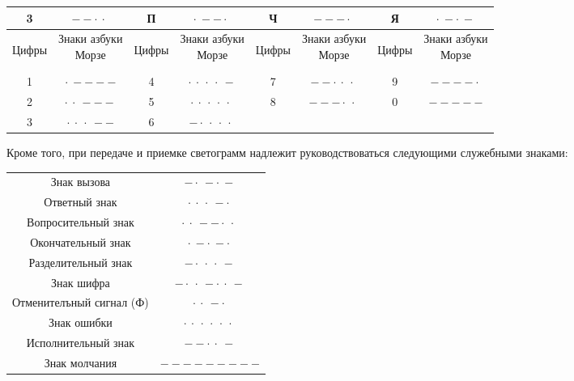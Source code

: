 \documentclass[a4paper, 12pt, twoside, final]{scrbook}
\begin{document}
\begin{longtable}{cccccccc}
	3 & \Large $- - \cdot\  \cdot\ $ & П & \Large $\cdot\  - - \cdot\ $ & Ч & \Large $- - - \cdot\ $ & Я & \Large $\cdot\  - \cdot\  -$ \\
	\midrule
	\midrule
	\begin{sideways}Цифры\end{sideways} & \shortstack[c]{Знаки азбуки\\Морзе} & \begin{sideways}Цифры\end{sideways} & \shortstack[c]{Знаки азбуки\\Морзе} & \begin{sideways}Цифры\end{sideways} & \shortstack[c]{Знаки азбуки\\Морзе} & \begin{sideways}Цифры\end{sideways} & \shortstack[c]{Знаки азбуки\\Морзе} \\
	\midrule
	1 & \Large $\cdot\  - - - -$ & 4 & \Large $\cdot\  \cdot\  \cdot\  \cdot\  -$ & 7 & \Large $- - \cdot\  \cdot\  \cdot\ $ & 9 & \Large $- - - - \cdot\ $ \\
	\midrule
	2 & \Large $\cdot\  \cdot\  - - -$ & 5 & \Large $\cdot\  \cdot\  \cdot\  \cdot\  \cdot\ $ & 8 & \Large $- - - \cdot\  \cdot\ $ & 0 & \Large $- - - - -$ \\
	\midrule
	3 & \Large $\cdot\  \cdot\  \cdot\  - -$ & 6 & \Large $- \cdot\  \cdot\  \cdot\  \cdot\ $ &  &  &  &\\ 
	\bottomrule
\end{longtable}

Кроме того, при передаче и приемке светограмм надлежит руководствоваться следующими служебными знаками:

\begin{longtable}{cc}
	Знак вызова & \Huge $- \cdot\  - \cdot\  -$ \\
	Ответный знак & \Huge $\cdot\  \cdot\  \cdot\  - \cdot\ $ \\
	Вопросительный знак & \Huge $\cdot\  \cdot\  - - \cdot\  \cdot\ $ \\
	Окончательный знак & \Huge $\cdot\  - \cdot\  - \cdot\ $ \\
	Разделительный знак & \Huge $- \cdot\  \cdot\  \cdot\  -$ \\
	Знак шифра & \Huge $- \cdot\  \cdot\  - \cdot\  \cdot\  -$ \\
	Отменителъный сигнал (Ф) & \Huge $\cdot\  \cdot\  - \cdot\ $ \\
	Знак ошибки & \Huge $\cdot\  \cdot\  \cdot\  \cdot\  \cdot\  \cdot\ $ \\
	Исполнительный знак & \Huge $- - \cdot\  \cdot\  -$ \\
	Знак молчания & \Huge $- - - - - - - - -$ \\
\end{longtable}

%
%


%
\end{document}
